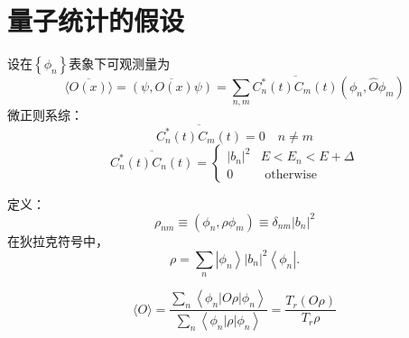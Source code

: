 \documentclass[12pt, a4paper, oneside]{ctexbook}
\newcommand{\hl}[1]{\hlbox{#1}}
\newcounter{#2}
\newcounter{#2}[#1]
\numberwithin{#2}{#1}
\newcommand{\dkuo}[1]{\left\lbrace#1\right\rbrace}
\begin{document}
          \section{量子统计的假设}
          \begin{claim}
            设在\(\dkuo{\phi_n}\)表象下可观测量为
            \begin{equation}
              \overline{\langle O(x)\rangle}=\overline{(\psi, O(x) \psi)}=\sum_{n, m} \overline{C_n^*(t) C_m(t)}\left(\phi_n, \hat{O} \phi_m\right)
            \end{equation}
            微正则系综：
            $$\overline{C_n^*(t) C_m(t)}=0 \quad n \neq m$$
            $$\overline{C_n^*(t) C_n(t)}= \begin{cases}|b_n|^2 & E<E_n<E+\Delta \\ 0 & \text { otherwise }\end{cases}$$
          \end{claim}
          \begin{define}
            定义\hl{密度矩阵}：
            \begin{equation}
              \rho_{n m} \equiv\left(\phi_n, \rho \phi_m\right) \equiv \delta_{n m}\left|b_n\right|^2
            \end{equation}
            在狄拉克符号中，
            \begin{equation}
              \rho=\sum_n\left|\phi_n\right\rangle\left|b_n\right|^2\left\langle\phi_n\right| .
            \end{equation}
          \end{define}
          \begin{deduce}
            \begin{equation}
              \langle O\rangle=\frac{\sum_n\left\langle\phi_n|O \rho| \phi_n\right\rangle}{\sum_n\left\langle\phi_n|\rho| \phi_n\right\rangle}=\frac{T_r(O \rho)}{T_r \rho}
            \end{equation}
          \end{deduce}
\end{document}
